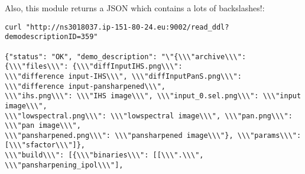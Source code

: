 \documentclass[a4paper,12pt]{article}
\begin{document}
Also, this module returns a JSON which contains a lots of backslashes!:

\begin{verbatim}
curl "http://ns3018037.ip-151-80-24.eu:9002/read_ddl?demodescriptionID=359"

{"status": "OK", "demo_description": "\"{\\\"archive\\\": {\\\"files\\\": {\\\"diffInputIHS.png\\\":
\\\"difference input-IHS\\\", \\\"diffInputPanS.png\\\": \\\"difference input-pansharpened\\\",
\\\"ihs.png\\\": \\\"IHS image\\\", \\\"input_0.sel.png\\\": \\\"input image\\\",
\\\"lowspectral.png\\\": \\\"lowspectral image\\\", \\\"pan.png\\\": \\\"pan image\\\",
\\\"pansharpened.png\\\": \\\"pansharpened image\\\"}, \\\"params\\\": [\\\"sfactor\\\"]},
\\\"build\\\": [{\\\"binaries\\\": [[\\\".\\\", \\\"pansharpening_ipol\\\"],
\end{verbatim}
\end{document}
